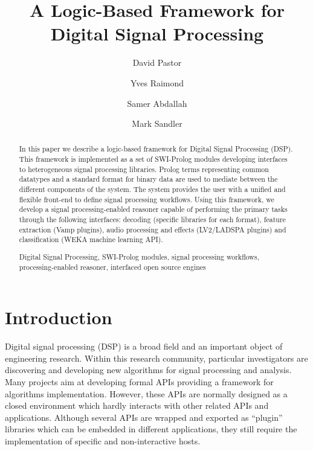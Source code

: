 \documentclass[runningheads]{llncs}
\newcommand{\keywords}[1]{\par\addvspace\baselineskip
\noindent\keywordname\enspace\ignorespaces#1}
\begin{document}
\mainmatter

\title{A Logic-Based Framework for Digital Signal Processing}


\author{David Pastor\and Yves Raimond\and Samer Abdallah\and Mark Sandler}


\maketitle


\begin{abstract}
In this paper we describe a logic-based framework for Digital Signal Processing (DSP). This framework is implemented as a set of SWI-Prolog modules developing interfaces to heterogeneous signal processing libraries. Prolog terms representing common datatypes and a standard format for binary data are used to mediate between the different components of the system. The system provides the user with a unified and flexible front-end to define signal processing workflows. Using this framework, we develop a signal processing-enabled reasoner capable of performing the primary tasks through the following interfaces: decoding (specific libraries for each format), feature extraction (Vamp plugins), audio processing and effects (LV2/LADSPA plugins) and classification (WEKA machine learning API).

\keywords{Digital Signal Processing, SWI-Prolog modules, signal processing workflows, processing-enabled reasoner, interfaced open source engines}
\end{abstract}

\section{Introduction}\label{sec:intro}
Digital signal processing (DSP) is a broad field and an important object of engineering research. Within this research community, particular investigators are discovering and developing new algorithms for signal processing and analysis. Many projects aim at developing formal APIs providing a framework for algorithms implementation. However, these APIs are normally designed as a closed environment which hardly interacts with other related APIs and applications. Although several APIs are wrapped and exported as ``plugin'' libraries which can be embedded in different applications, they still require the implementation of specific and non-interactive hosts.
\end{document}
